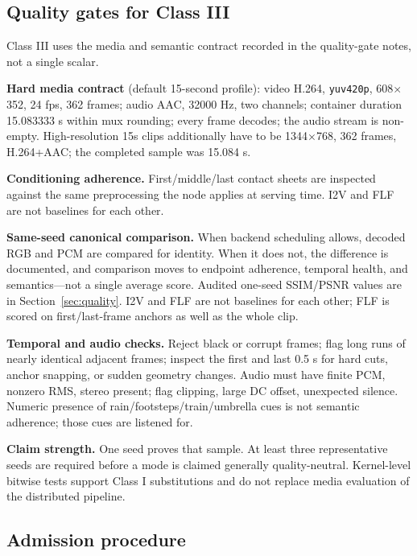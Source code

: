 \documentclass[11pt]{article}
\begin{document}
\subsection{Quality gates for Class III}
\label{sec:quality-gates}

Class III uses the media and semantic contract recorded in the quality-gate notes, not a single scalar.

\textbf{Hard media contract} (default 15-second profile): video H.264, \texttt{yuv420p}, 608$\times$352, 24 fps, 362 frames; audio AAC, 32000 Hz, two channels; container duration 15.083333 s within mux rounding; every frame decodes; the audio stream is non-empty. High-resolution 15s clips additionally have to be 1344$\times$768, 362 frames, H.264+AAC; the completed sample was 15.084 s.

\textbf{Conditioning adherence.} First/middle/last contact sheets are inspected against the same preprocessing the node applies at serving time. I2V and FLF are not baselines for each other.

\textbf{Same-seed canonical comparison.} When backend scheduling allows, decoded RGB and PCM are compared for identity. When it does not, the difference is documented, and comparison moves to endpoint adherence, temporal health, and semantics---not a single average score. Audited one-seed SSIM/PSNR values are in Section~\ref{sec:quality}. I2V and FLF are not baselines for each other; FLF is scored on first/last-frame anchors as well as the whole clip.

\textbf{Temporal and audio checks.} Reject black or corrupt frames; flag long runs of nearly identical adjacent frames; inspect the first and last 0.5 s for hard cuts, anchor snapping, or sudden geometry changes. Audio must have finite PCM, nonzero RMS, stereo present; flag clipping, large DC offset, unexpected silence. Numeric presence of rain/footsteps/train/umbrella cues is not semantic adherence; those cues are listened for.

\textbf{Claim strength.} One seed proves that sample. At least three representative seeds are required before a mode is claimed generally quality-neutral. Kernel-level bitwise tests support Class I substitutions and do not replace media evaluation of the distributed pipeline.

\subsection{Admission procedure}
\label{sec:admission}
\end{document}

